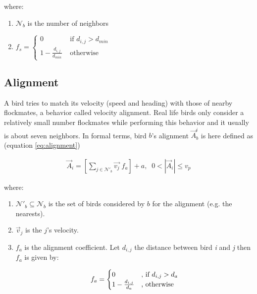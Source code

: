 where:

\begin{enumerate}
\item \(\mathcal{N}_b\) is the number of neighbors
\item $
	f_s = \begin{cases}
	0 &\mbox{ if }  d_{i,j} > d_{min}\\
	1 - \frac{d_{i,j}}{d_{min}} &\mbox{ otherwise}
	\end{cases}$
\end{enumerate}

\subsection{Alignment}
A bird tries to match its velocity (speed and heading) with those of
nearby flockmates, a behavior called velocity alignment. Real life birds only consider a relatively small number flockmates while performing this behavior and it usually is about seven neighbors\cite{Hemelrijk}.
In formal terms, bird $b$'s alignment \(\vec{A}_b^i\) is here defined as (equation \ref{eq:alignment})

\begin{align}
  \vec{A}_i = \left[\sum_{j \in \mathcal{N}'_b}{\vec{v_j}}\;f_a\right] + a, \;\;0 < |\vec{A}_i| \leq v_p
  \label{eq:alignment}
\end{align}

where:

\begin{enumerate}
\item \(\mathcal{N}'_b \subseteq \mathcal{N}_b\) is the set of birds considered by $b$ for the alignment (e.g. the nearests).
\item \(\vec{v}_j\) is the $j$'s velocity.
\item \(f_a\) is the alignment coefficient. Let \(d_{i,j}\) the distance between bird \emph{i} and \emph{j} then \(f_a\) is given by:

\begin{equation*}
	f_a = \begin{cases}
	0 &\text{, if $ d_{i,j} > d_a$}\\
	1- \frac{d_{i,j}}{d_a} &\text{, otherwise}
	\end{cases}
\end{equation*}
\end{enumerate}

